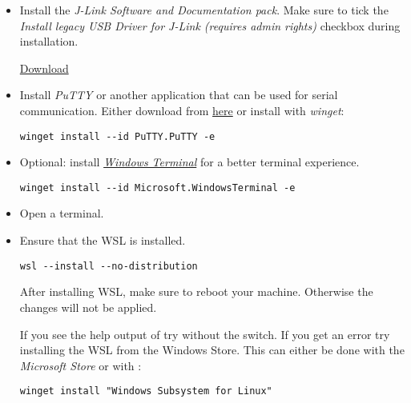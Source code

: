 \begin{itemize}
  \item Install the \emph{J-Link Software and Documentation pack}.
        Make sure to tick the \emph{Install legacy USB Driver for J-Link (requires admin rights)} checkbox during installation.

        \href{https://www.segger.com/downloads/jlink/JLink_Windows_x86_64.exe}{Download}

  \item Install \emph{PuTTY} or another application that can be used for serial
        communication.
        Either download from \href{https://putty.org/}{here} or install with \emph{winget}:

        \begin{lstlisting}
winget install --id PuTTY.PuTTY -e
\end{lstlisting}

  \item Optional: install \href{https://aka.ms/terminal}{\emph{Windows Terminal}} for a better terminal experience.

        \begin{lstlisting}
winget install --id Microsoft.WindowsTerminal -e
\end{lstlisting}

  \item Open a terminal.

  \item Ensure that the WSL is installed.
        \begin{lstlisting}
wsl --install --no-distribution
\end{lstlisting}

        \begin{infobox}
          After installing WSL, make sure to reboot your machine.
          Otherwise the changes will not be applied.
        \end{infobox}

        \begin{infobox}
          If you see the help output of  try without the  switch.
          If you get an error try installing the WSL from the Windows Store.
          This can either be done with the \emph{Microsoft Store} or with :

          \begin{lstlisting}
winget install "Windows Subsystem for Linux"
\end{lstlisting}


\end{infobox}
\end{itemize}

